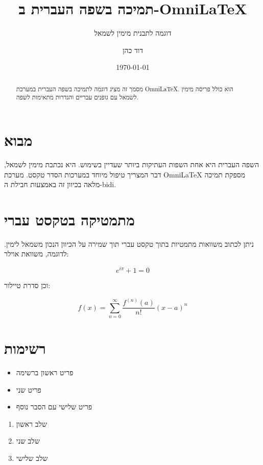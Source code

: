 \documentclass[doctype=article,language=hebrew]{../../omnilatex}
\title{תמיכה בשפה העברית ב-OmniLaTeX}
\subtitle{דוגמה לתבנית מימין לשמאל}
\author{דוד כהן}
\date{\today}
\begin{document}
\maketitle

\begin{abstract}
מסמך זה מציג דוגמה לתמיכה בשפה העברית במערכת OmniLaTeX. הוא כולל
פריסה מימין לשמאל עם גופנים עבריים והגדרות מתאימות לשפה.
\end{abstract}

\section{מבוא}

השפה העברית היא אחת השפות העתיקות ביותר שעדיין בשימוש. היא נכתבת
מימין לשמאל, דבר המצריך טיפול מיוחד במערכות הסדר טקסט. מערכת
OmniLaTeX מספקת תמיכה מלאה בכיוון זה באמצעות חבילת ה-bidi.

\section{מתמטיקה בטקסט עברי}

ניתן לכתוב משוואות מתמטיות בתוך טקסט עברי תוך שמירה על הכיוון
הנכון משמאל לימין. לדוגמה, משוואת אוילר:

\begin{equation}
  e^{i\pi} + 1 = 0
  \label{eq:euler}
\end{equation}

וכן סדרת טיילור:

\begin{equation}
  f(x) = \sum_{n=0}^{\infty} \frac{f^{(n)}(a)}{n!}(x - a)^{n}
  \label{eq:taylor}
\end{equation}

\section{רשימות}

\begin{itemize}
  \item פריט ראשון ברשימה
  \item פריט שני
  \item פריט שלישי עם הסבר נוסף
\end{itemize}

\begin{enumerate}
  \item שלב ראשון
  \item שלב שני
  \item שלב שלישי
\end{enumerate}
\end{document}
